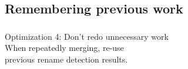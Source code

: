 \documentclass[compress,t]{beamer}
\begin{document}

\subsection[Remembering]{Remembering previous work}
\begin{frame}
  \frametitle{}

  \vfill
  {\Large
  \begin{center}
    Optimization 4: Don't redo unnecessary work\\
    \vspace*{\baselineskip}
    \pause
    When repeatedly merging, re-use\\ previous rename detection results.
  \end{center}
  }
  \vfill
\end{frame}

\end{document}
